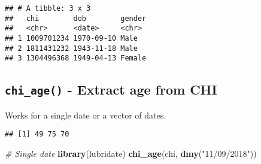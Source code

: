 \documentclass[]{book}
\newenvironment{Shaded}{\begin{snugshade}}{\end{snugshade}}
\newcommand{\CommentTok}[1]{\textcolor[rgb]{0.56,0.35,0.01}{\textit{#1}}}
\newcommand{\ControlFlowTok}[1]{\textcolor[rgb]{0.13,0.29,0.53}{\textbf{#1}}}
\newcommand{\DataTypeTok}[1]{\textcolor[rgb]{0.13,0.29,0.53}{#1}}
\newcommand{\DecValTok}[1]{\textcolor[rgb]{0.00,0.00,0.81}{#1}}
\newcommand{\KeywordTok}[1]{\textcolor[rgb]{0.13,0.29,0.53}{\textbf{#1}}}
\newcommand{\NormalTok}[1]{#1}
\newcommand{\OperatorTok}[1]{\textcolor[rgb]{0.81,0.36,0.00}{\textbf{#1}}}
\newcommand{\StringTok}[1]{\textcolor[rgb]{0.31,0.60,0.02}{#1}}
\theoremstyle{definition}
\theoremstyle{definition}
\theoremstyle{definition}
\theoremstyle{remark}
\begin{document}
\begin{Shaded}
\end{Shaded}

\begin{verbatim}
## # A tibble: 3 x 3
##   chi        dob        gender
##   <chr>      <date>     <chr> 
## 1 1009701234 1970-09-10 Male  
## 2 1811431232 1943-11-18 Male  
## 3 1304496368 1949-04-13 Female
\end{verbatim}

\hypertarget{chi_age---extract-age-from-chi}{%
\subsection{\texorpdfstring{\texttt{chi\_age()} - Extract age from
CHI}{chi\_age() - Extract age from CHI}}\label{chi_age---extract-age-from-chi}}

Works for a single date or a vector of dates.

\begin{Shaded}
\end{Shaded}

\begin{verbatim}
## [1] 49 75 70
\end{verbatim}

\begin{Shaded}
\begin{Highlighting}[]
\CommentTok{# Single date}
\KeywordTok{library}\NormalTok{(lubridate)}
\KeywordTok{chi_age}\NormalTok{(chi, }\KeywordTok{dmy}\NormalTok{(}\StringTok{"11/09/2018"}\NormalTok{))}
\end{Highlighting}
\end{Shaded}
\end{document}
